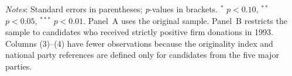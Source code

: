 \documentclass[12pt,a4paper]{article}
\begin{document}
\begin{table}[!htbp]
\vspace{1mm}
\begin{flushleft}
\footnotesize
\justifying
\textit{Notes}: Standard errors in parentheses; \textit{p}-values in brackets. $^{*}$ \(p<0.10\), $^{**}$ \(p<0.05\), $^{***}$ \(p<0.01\).
Panel~A uses the original sample.
Panel~B restricts the sample to candidates who received strictly positive firm donations in 1993.
Columns (3)--(4) have fewer observations because the originality index and national party references are defined only for candidates from the five major parties.
\end{flushleft}
\end{table}
\end{document}
